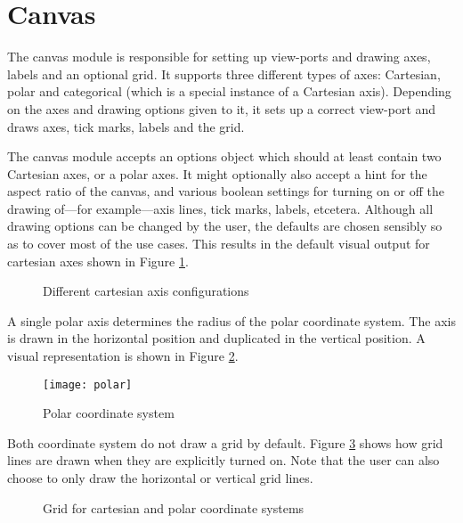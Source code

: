 \section{Canvas}
The canvas module is responsible for setting up view-ports and drawing axes, labels and an optional grid. It supports three different types of axes: Cartesian, polar and categorical (which is a special instance of a Cartesian axis). Depending on the axes and drawing options given to it, it sets up a correct view-port and draws axes, tick marks, labels and the grid. 

The canvas module accepts an options object which should at least contain two Cartesian axes, or a polar axes. It might optionally also accept a hint for the aspect ratio of the canvas, and various boolean settings for turning on or off the drawing of---for example---axis lines, tick marks, labels, etcetera. Although all drawing options can be changed by the user, the defaults are chosen sensibly so as to cover most of the use cases. This results in the  default visual output for cartesian axes shown in Figure \ref{cartesianaxes}.

\begin{figure}[h!]
  \centering
  \hspace{10pt}
  \hspace{10pt}
  \caption{Different cartesian axis configurations}
  \label{cartesianaxes}
\end{figure}

A single polar axis determines the radius of the polar coordinate system. The axis is drawn in the horizontal position and duplicated in the vertical position. A visual representation is shown in Figure \ref{polar}.

\begin{figure}[h!]
\centering
\texttt{[image: polar]}
\caption{Polar coordinate system}
\label{polar}
\end{figure}

Both coordinate system do not draw a grid by default. Figure \ref{gridon} shows how grid lines are drawn when they are explicitly turned on. Note that the user can also choose to only draw the horizontal or vertical grid lines.

\begin{figure}[h!]
	\centering
	\caption{Grid for cartesian and polar coordinate systems}
	\label{gridon}
\end{figure}

